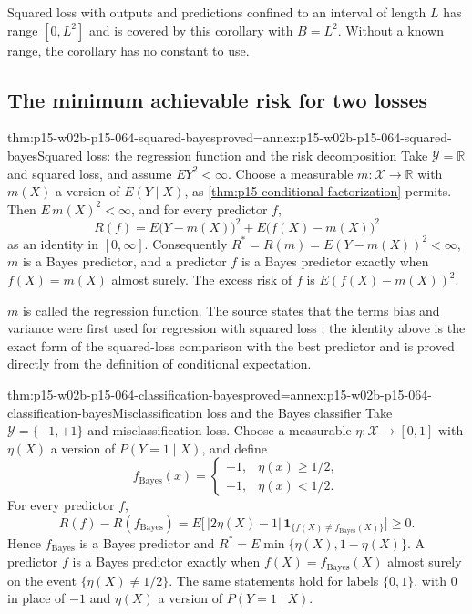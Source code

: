 Squared loss with outputs and predictions confined to an interval of length
\(L\) has range \([0,L^2]\) and is covered by this corollary with
\(B=L^2\). Without a known range, the corollary has no constant to use.

\subsection{The minimum achievable risk for two losses}

\begin{hbtheorem}{thm:p15-w02b-p15-064-squared-bayes}{proved=annex:p15-w02b-p15-064-squared-bayes}{Squared loss: the regression function and the risk decomposition}
Take \(\mathcal Y=\mathbb R\) and squared loss, and assume \(EY^2<\infty\).
Choose a measurable \(m:\mathcal X\to\mathbb R\) with \(m(X)\) a version of
\(E(Y\mid X)\), as \cref{thm:p15-conditional-factorization} permits. Then
\(E\,m(X)^2<\infty\), and for every predictor \(f\),
\[
 R(f)=E\bigl(Y-m(X)\bigr)^2+E\bigl(f(X)-m(X)\bigr)^2
\]
as an identity in \([0,\infty]\). Consequently
\(R^{*}=R(m)=E(Y-m(X))^2<\infty\), \(m\) is a Bayes predictor, and a
predictor \(f\) is a Bayes predictor exactly when \(f(X)=m(X)\) almost
surely. The excess risk of \(f\) is \(E(f(X)-m(X))^2\).
\end{hbtheorem}

\(m\) is called the regression function. The source states that the terms
bias and variance were first used for regression with squared loss
\cite[Section~2.4, p.~9]{LuxburgScholkopf2008Author}; the identity above is
the exact form of the squared-loss comparison with the best predictor and
is proved directly from the definition of conditional expectation.

\begin{hbtheorem}{thm:p15-w02b-p15-064-classification-bayes}{proved=annex:p15-w02b-p15-064-classification-bayes}{Misclassification loss and the Bayes classifier}
Take \(\mathcal Y=\{-1,+1\}\) and misclassification loss. Choose a measurable
\(\eta:\mathcal X\to[0,1]\) with \(\eta(X)\) a version of
\(P(Y=1\mid X)\), and define
\[
 f_{\mathrm{Bayes}}(x)=\begin{cases}+1,&\eta(x)\geq1/2,\\-1,&\eta(x)<1/2.\end{cases}
\]
For every predictor \(f\),
\[
 R(f)-R(f_{\mathrm{Bayes}})
 =E\bigl[\,|2\eta(X)-1|\,\mathbf1_{\{f(X)\neq f_{\mathrm{Bayes}}(X)\}}\bigr]\geq0.
\]
Hence \(f_{\mathrm{Bayes}}\) is a Bayes predictor and
\(R^{*}=E\min\{\eta(X),1-\eta(X)\}\). A predictor \(f\) is a Bayes
predictor exactly when \(f(X)=f_{\mathrm{Bayes}}(X)\) almost surely on the
event \(\{\eta(X)\neq1/2\}\). The same statements hold for labels
\(\{0,1\}\), with \(0\) in place of \(-1\) and \(\eta(X)\) a version of
\(P(Y=1\mid X)\).
\end{hbtheorem}

